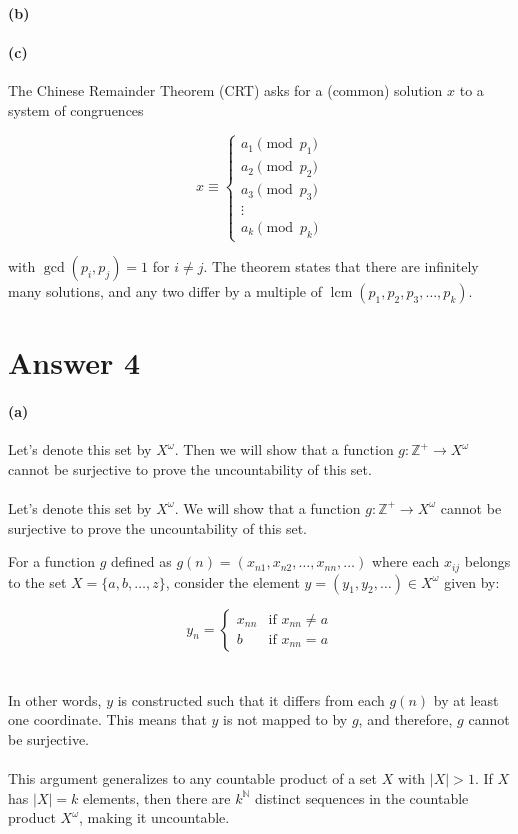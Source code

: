 \documentclass[12pt]{article}
\begin{document}
\paragraph{(b)}
\paragraph{(c)}
The Chinese Remainder Theorem (CRT) asks for a (common) solution \(x\) to a system of congruences

\[ x \equiv \begin{cases} a_1 \pmod{p_1} \\ a_2 \pmod{p_2} \\ a_3 \pmod{p_3} \\ \vdots \\ a_k \pmod{p_k} \end{cases} \]

with \(\gcd(p_i, p_j) = 1\) for \(i \neq j\). The theorem states that there are infinitely many solutions, and any two differ by a multiple of \(\operatorname{lcm}(p_1, p_2, p_3, \ldots, p_k)\).


\section*{Answer 4}
\paragraph{(a)}
Let's denote this set by \(X^{\omega}\). Then we will show that a function \(g : \mathbb{Z}^+ \rightarrow X^{\omega}\) cannot be surjective
to prove the uncountability of this set.
\\ \\
Let's denote this set by \(X^\omega\). We will show that a function \(g:\mathbb{Z}^+ \rightarrow X^\omega\) cannot be surjective to prove the uncountability of this set.

For a function \(g\) defined as \(g(n) = (x_{n1}, x_{n2}, \ldots, x_{nn}, \ldots)\) where each \(x_{ij}\) belongs to the set \(X = \{a, b, \ldots, z\}\), consider the element \(y = (y_1, y_2, \ldots) \in X^\omega\) given by:

\[
y_n = 
\begin{cases}
    x_{nn} & \text{if } x_{nn} \neq a \\
    b & \text{if } x_{nn} = a
\end{cases}
\]
\\ \\
In other words, \(y\) is constructed such that it differs from each \(g(n)\) by at least one coordinate. This means that \(y\) is not mapped to by \(g\), and therefore, \(g\) cannot be surjective.
\\ \\
This argument generalizes to any countable product of a set \(X\) with \(\lvert X \rvert > 1\). If \(X\) has \(\lvert X \rvert = k\) elements, then there are \(k^{\mathbb{N}}\) distinct sequences in the countable product \(X^\omega\), making it uncountable.
\end{document}
